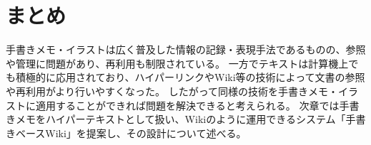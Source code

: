 \section{まとめ}
手書きメモ・イラストは広く普及した情報の記録・表現手法であるものの、参照や管理に問題があり、再利用も制限されている。
一方でテキストは計算機上でも積極的に応用されており、ハイパーリンクやWiki等の技術によって文書の参照や再利用がより行いやすくなった。
したがって同様の技術を手書きメモ・イラストに適用することができれば問題を解決できると考えられる。
次章では手書きメモをハイパーテキストとして扱い、Wikiのように運用できるシステム「手書きベースWiki」を提案し、その設計について述べる。
